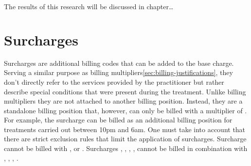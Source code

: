 The results of this research will be discussed in chapter\ldots


\section{Surcharges}\label{sec:surcharges}
Surcharges are additional billing codes that can be added to the base charge.
Serving a similar purpose as billing multipliers\ref{sec:billing-justifications}, they don't directly refer to the services provided by the practitioner but rather describe special conditions that were present during the treatment\cite{walter2008abrechnung}.
Unlike billing multipliers they are not attached to another billing position.
Instead, they are a standalone billing position that, however, can only be billed with a multiplier of .
For example, the surcharge  can be billed as an additional billing position for treatments carried out between 10pm and 6am.
One must take into account that there are strict exclusion rules that limit the application of surcharges\cite{kommentar2012zuschlage}.
Surcharge  cannot be billed with ,  or .
Surcharges , , , ,  cannot be billed in combination with , , , \cite{kommentar2012zuschlage}.

